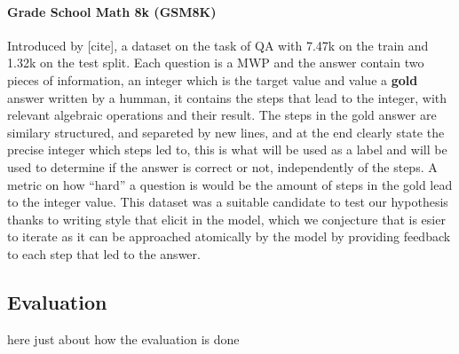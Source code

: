 \documentclass[a4paper,10pt]{article}
\begin{document}
\paragraph{Grade School Math 8k (GSM8K)}
Introduced by [cite], a dataset on the task of QA with 7.47k on the train and 1.32k on the test split. Each question is a MWP and the answer contain two pieces of information, an integer which is the target value and value a \textbf{gold} answer written by a humman, it contains the steps that lead to the integer, with relevant algebraic operations and their result. The steps in the gold answer are similary structured, and separeted by new lines, and at the end clearly state the precise integer which steps led to, this is what will be used as a label and will be used to determine if the answer is correct or not, independently of the steps. A metric on how ``hard'' a question is would be the amount of steps in the gold lead to the integer value. This dataset was a suitable candidate to test our hypothesis thanks to writing style that elicit in the model, which we conjecture that is esier to iterate as it can be approached atomically by the model by providing feedback to each step that led to the answer.
\subsection{Evaluation}
here just about how the evaluation is done
\end{document}
